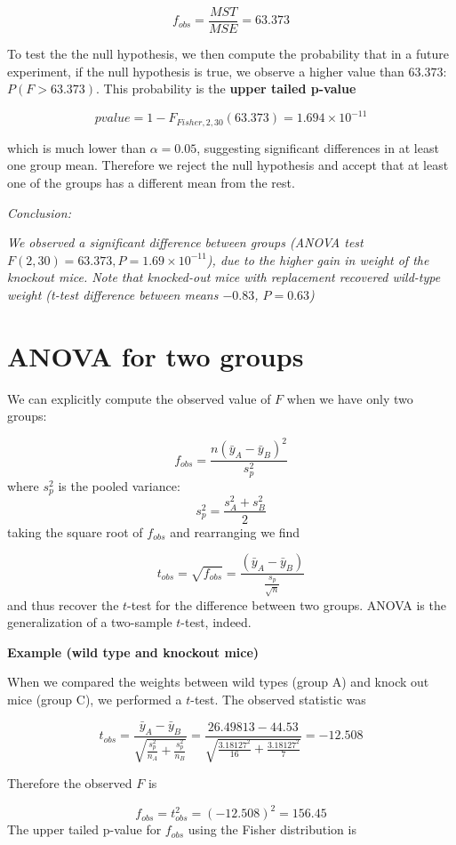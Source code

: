 \documentclass[
]{book}
\begin{document}
\[f_{obs}=\frac{MST}{MSE}=63.373\]

To test the the null hypothesis, we then compute the probability that in a future experiment, if the null hypothesis is true, we observe a higher value than \(63.373\): \(P(F>63.373)\). This probability is the \textbf{upper tailed p-value}

\[pvalue=1-F_{Fisher,2,30}(63.373)=1.694 \times 10^{-11}\]

which is much lower than \(\alpha=0.05\), suggesting significant differences in at least one group mean. Therefore we reject the null hypothesis and accept that at least one of the groups has a different mean from the rest.

\emph{Conclusion:}

\emph{We observed a significant difference between groups (ANOVA test \(F(2,30)=63.373, P= 1.69 \times 10^{-11}\)), due to the higher gain in weight of the knockout mice. Note that knocked-out mice with replacement recovered wild-type weight (t-test difference between means \(-0.83\), \(P=0.63\))}

\hypertarget{anova-for-two-groups}{%
\section{ANOVA for two groups}\label{anova-for-two-groups}}

We can explicitly compute the observed value of \(F\) when we have only two groups:

\[f_{obs}=\frac{n(\bar{y}_{A}-\bar{y}_{B})^2}{s^2_p}\]
where \(s^2_p\) is the pooled variance:
\[s^2_p= \frac{s_A^2 + s_B^2}{{2}}\]
taking the square root of \(f_{obs}\) and rearranging we find

\[t_{obs}=\sqrt{f_{obs}}=\frac{(\bar{y}_{A}-\bar{y}_{B})}{\frac{s_p}{\sqrt{n}}}\]
and thus recover the \(t\)-test for the difference between two groups. ANOVA is the generalization of a two-sample \(t\)-test, indeed.

\textbf{Example (wild type and knockout mice)}

When we compared the weights between wild types (group A) and knock out mice (group C), we performed a \(t\)-test. The observed statistic was

\[t_{obs}=\frac{\bar{y}_A-\bar{y}_B }{\sqrt{\frac{s^2_p}{n_A}+\frac{s^2_p}{n_B}}}=\frac{26.49813-44.53}{\sqrt{\frac{3.18127^2}{16}+\frac{3.18127^2}{7}}}=-12.508\]

Therefore the observed \(F\) is

\[f_{obs}=t_{obs}^2=(−12.508)^2=156.45\]
The upper tailed p-value for \(f_{obs}\) using the Fisher distribution is
\end{document}
